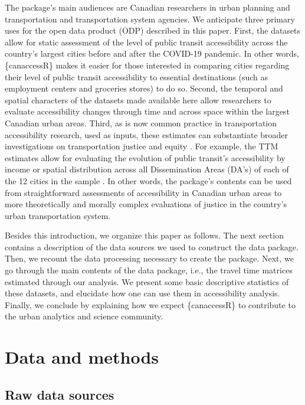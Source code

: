\documentclass[Royal,times,sageh]{sagej}
\begin{document}
The package's main audiences are Canadian researchers in urban planning
and transportation and transportation system agencies. We anticipate
three primary uses for the open data product (ODP) described in this
paper. First, the datasets allow for static assessment of the level of
public transit accessibility across the country's largest cities before
and after the COVID-19 pandemic. In other words, \{canaccessR\} makes it
easier for those interested in comparing cities regarding their level of
public transit accessibility to essential destinations (such as
employment centers and groceries stores) to do so. Second, the temporal
and spatial characters of the datasets made available here allow
researchers to evaluate accessibility changes through time and across
space within the largest Canadian urban areas. Third, as is now common
practice in transportation accessibility research, used as inputs, these
estimates can substantiate broader investigations on transportation
justice and equity
\citep{higginsChangesAccessibilityEmergency2021, humbertoHowTranslateJustice2023, pereiraGeographicAccessCOVID192021}.
For example, the TTM estimates allow for evaluating the evolution of
public transit's accessibility by income or spatial distribution across
all Dissemination Areas (DA's) of each of the 12 cities in the sample
\citep{pargaDemocraticAccessOur2024}. In other words, the package's
contents can be used from straightforward assessments of accessibility
in Canadian urban areas to more theoretically and morally complex
evaluations of justice in the country's urban transportation system.

Besides this introduction, we organize this paper as follows. The next
section contains a description of the data sources we used to construct
the data package. Then, we recount the data processing necessary to
create the package. Next, we go through the main contents of the data
package, i.e., the travel time matrices estimated through our analysis.
We present some basic descriptive statistics of these datasets, and
elucidate how one can use them in accessibility analysis. Finally, we
conclude by explaining how we expect \{canaccessR\} to contribute to the
urban analytics and science community.

\section{Data and methods}\label{data-and-methods}

\subsection{Raw data sources}\label{raw-data-sources}
\end{document}
